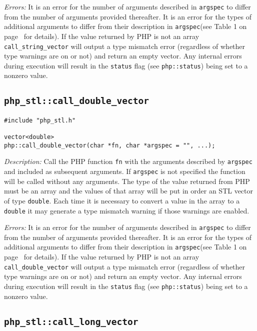 \documentclass[11pt,titlepage]{article}
\begin{document}
\emph{Errors:} It is an error for the number of arguments described in \verb|argspec| to differ from the number of arguments provided thereafter. It is an error for the types of additional arguments to differ from their description in \verb|argspec|(see Table 1 on page~\pageref{Table1} for details). If the value returned by PHP is not an array \verb|call_string_vector| will output a type mismatch error (regardless of whether type warnings are on or not) and return an empty vector. Any internal errors during execution will result in the \verb|status| flag (see \verb|php::status|) being set to a nonzero value.


\subsection{\texttt{php\_stl::call\_double\_vector}}

\begin{verbatim}
#include "php_stl.h"

vector<double> 
php::call_double_vector(char *fn, char *argspec = "", ...);
\end{verbatim}

\emph{Description:} Call the PHP function \verb|fn| with the arguments described by \verb|argspec| and included as subsequent arguments. If \verb|argspec| is not specified the function will be called without any arguments. The type of the value returned from PHP must be an array and the values of that array will be put in order an STL vector of type \verb|double|. Each time it is necessary to convert a value in the array to a \verb|double| it may generate a type mismatch warning if those warnings are enabled.

\emph{Errors:} It is an error for the number of arguments described in \verb|argspec| to differ from the number of arguments provided thereafter. It is an error for the types of additional arguments to differ from their description in \verb|argspec|(see Table 1 on page~\pageref{Table1} for details). If the value returned by PHP is not an array \verb|call_double_vector| will output a type mismatch error (regardless of whether type warnings are on or not) and return an empty vector. Any internal errors during execution will result in the \verb|status| flag (see \verb|php::status|) being set to a nonzero value.


\subsection{\texttt{php\_stl::call\_long\_vector}}
\end{document}
